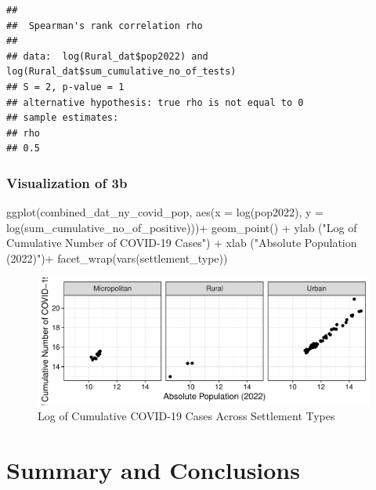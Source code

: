 \documentclass[
  12pt,
]{article}
\newenvironment{Shaded}{\begin{snugshade}}{\end{snugshade}}
\newcommand{\AttributeTok}[1]{\textcolor[rgb]{0.77,0.63,0.00}{#1}}
\newcommand{\FunctionTok}[1]{\textcolor[rgb]{0.00,0.00,0.00}{#1}}
\newcommand{\NormalTok}[1]{#1}
\newcommand{\SpecialCharTok}[1]{\textcolor[rgb]{0.00,0.00,0.00}{#1}}
\newcommand{\StringTok}[1]{\textcolor[rgb]{0.31,0.60,0.02}{#1}}
\begin{document}
\begin{verbatim}
## 
##  Spearman's rank correlation rho
## 
## data:  log(Rural_dat$pop2022) and log(Rural_dat$sum_cumulative_no_of_tests)
## S = 2, p-value = 1
## alternative hypothesis: true rho is not equal to 0
## sample estimates:
## rho 
## 0.5
\end{verbatim}

\hypertarget{visualization-of-3b}{%
\subsubsection{Visualization of 3b}\label{visualization-of-3b}}

\begin{Shaded}
\begin{Highlighting}[]
\FunctionTok{ggplot}\NormalTok{(combined\_dat\_ny\_covid\_pop, }\FunctionTok{aes}\NormalTok{(}\AttributeTok{x =} \FunctionTok{log}\NormalTok{(pop2022), }\AttributeTok{y =} \FunctionTok{log}\NormalTok{(sum\_cumulative\_no\_of\_positive)))}\SpecialCharTok{+}
  \FunctionTok{geom\_point}\NormalTok{() }\SpecialCharTok{+} 
  \FunctionTok{ylab}\NormalTok{ (}\StringTok{"Log of Cumulative Number of COVID{-}19 Cases"}\NormalTok{) }\SpecialCharTok{+}
  \FunctionTok{xlab}\NormalTok{ (}\StringTok{"Absolute Population (2022)"}\NormalTok{)}\SpecialCharTok{+}
  \FunctionTok{facet\_wrap}\NormalTok{(}\FunctionTok{vars}\NormalTok{(settlement\_type)) }
\end{Highlighting}
\end{Shaded}

\begin{figure}

\includegraphics{EDA_Final_Group_Project_files/figure-latex/unnamed-chunk-26-1} \hfill{}

\caption{Log of Cumulative COVID-19 Cases Across Settlement Types}\label{fig:unnamed-chunk-26}
\end{figure}

\newpage

\hypertarget{summary-and-conclusions}{%
\section{Summary and Conclusions}\label{summary-and-conclusions}}
\end{document}

